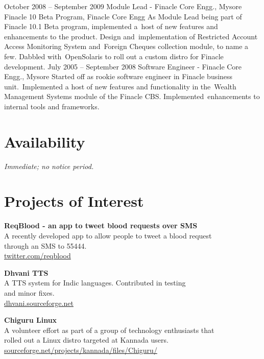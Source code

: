 \documentclass[11pt,a4paper,sans]{moderncv}
\begin{document}
\cventry
{October 2008 -- September 2009}
{Module Lead - Finacle Core Engg., Mysore}
{Finacle 10 Beta Program, Finacle Core Engg}
{}
{}
{As Module Lead being part of Finacle 10.1 Beta program, implemented a\
host of new features and enhancements to the product. Design and\
implementation of Restricted Account Access Monitoring System and\
Foreign Cheques collection module, to name a few. Dabbled with\
OpenSolaris to roll out a custom distro for Finacle development.\newline{}}
\cventry
{July 2005 -- September 2008}
{Software Engineer - Finacle Core Engg., Mysore}
{}
{}
{}
{Started off as rookie software engineer in Finacle business unit.\
Implemented a host of new features and functionality in the\
Wealth Management Systems module of the Finacle CBS. Implemented\
enhancements to internal tools and frameworks.\newline{} }

\section{Availability}
\cvlistitem
{\textit{\emph{Immediate}; no notice period.} 
}

\section{Projects of Interest}

\cvlistitem
{\textbf{ReqBlood - an app to tweet blood requests over SMS} 
  \\A recently developed app to allow people to tweet a blood request\\
    through an SMS to 55444.\\
		{\small {\url{twitter.com/reqblood}}} \\
}

\cvlistitem
{\textbf{Dhvani TTS}  
  \\A TTS system for Indic languages. Contributed in testing \\
		and minor fixes.\\
		{\small {\url{dhvani.sourceforge.net}}} \\
}

\cvlistitem
{\textbf{Chiguru Linux}  
  \\A volunteer effort as part of a group of technology enthusiasts that \\
		rolled out a Linux distro targeted at Kannada users.\\
		{\small {\url{sourceforge.net/projects/kannada/files/Chiguru/}}} 
}
\end{document}
